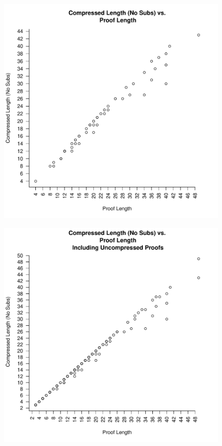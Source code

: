 \begin{figure}
\includegraphics[scale=0.5]{images/compress_length_no_sub_vs_length.pdf}
\end{figure}
\begin{figure}
\includegraphics[scale=0.5]{images/compress_length_no_sub_vs_length_all_proofs.pdf}
\end{figure}